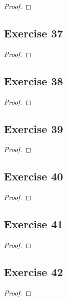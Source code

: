 \documentclass[14pt]{extarticle}
\begin{document}
\begin{proof}

\end{proof}

\subsection{Exercise 37}

\begin{proof}

\end{proof}

\subsection{Exercise 38}

\begin{proof}

\end{proof}

\subsection{Exercise 39}

\begin{proof}

\end{proof}

\subsection{Exercise 40}

\begin{proof}

\end{proof}

\subsection{Exercise 41}

\begin{proof}

\end{proof}

\subsection{Exercise 42}

\begin{proof}

\end{proof}
\end{document}
